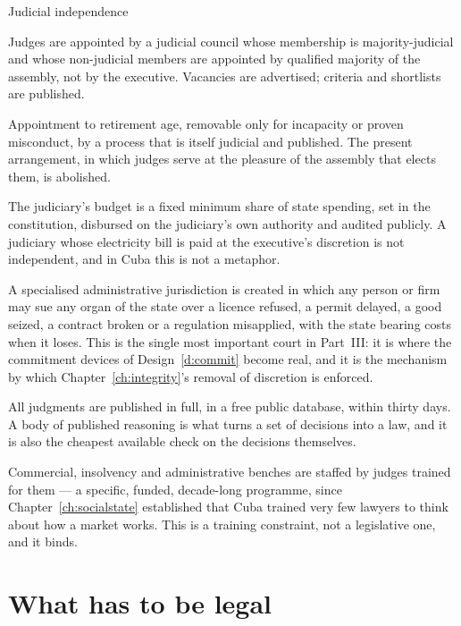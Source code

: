 \begin{design}{Judicial independence}
\label{d:courts}
\begin{rules}
 Judges are appointed by a judicial council whose membership
is majority-judicial and whose non-judicial members are appointed by qualified
majority of the assembly, not by the executive. Vacancies are advertised;
criteria and shortlists are published.

 Appointment to retirement age, removable only for incapacity or
proven misconduct, by a process that is itself judicial and published. The
present arrangement, in which judges serve at the pleasure of the assembly
that elects them, is abolished.

 The judiciary's budget is a fixed minimum share of state
spending, set in the constitution, disbursed on the judiciary's own authority
and audited publicly. A judiciary whose electricity bill is paid at the
executive's discretion is not independent, and in Cuba this is not a
metaphor.

 A specialised administrative jurisdiction is
created in which any person or firm may sue any organ of the state over a
licence refused, a permit delayed, a good seized, a contract broken or a
regulation misapplied, with the state bearing costs when it loses. This is the
single most important court in Part~III: it is where the commitment devices of
Design~\ref{d:commit} become real, and it is the mechanism by which
Chapter~\ref{ch:integrity}'s removal of discretion is enforced.

 All judgments are published in full, in a free public
database, within thirty days. A body of published reasoning is what turns a
set of decisions into a law, and it is also the cheapest available check on
the decisions themselves.

 Commercial, insolvency and administrative benches
are staffed by judges trained for them --- a specific, funded, decade-long
programme, since Chapter~\ref{ch:socialstate} established that Cuba trained
very few lawyers to think about how a market works. This is a training
constraint, not a legislative one, and it binds.
\end{rules}
\end{design}

\section{What has to be legal}

